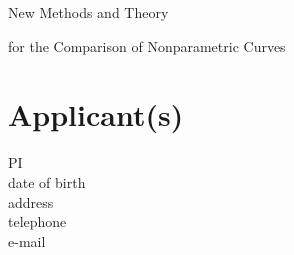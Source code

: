 \documentclass[a4paper,12pt]{article}
\begin{document}


\begin{center}
\LARGE{New Methods and Theory} 

\LARGE{for the Comparison of Nonparametric Curves}
\end{center}
\vspace{25pt}
 




\section{Applicant(s)}

PI \\
date of birth \\
address \\
telephone \\
e-mail 







\end{document}
